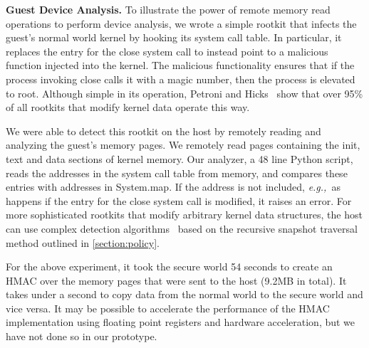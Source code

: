 \documentclass[pageno]{sig-alternate-05-2015}
\newcommand{\sectref}[1]{\autoref{#1}}
\newcommand{\myparagraph}[1]{\indent\par\noindent\textsf{\textbf{#1.}}}
\newcommand{\eg}{\textit{e.g.,}}
\begin{document}
\myparagraph{Guest Device Analysis}
%
To illustrate the power of remote memory read operations to perform device
analysis, we wrote a simple rootkit that infects the guest's normal world
kernel by hooking its system call table. In particular, it replaces the entry
for the \textsf{close} system call to instead point to a malicious function
injected into the kernel. The malicious functionality ensures that if the
process invoking \textsf{close} calls it with a magic number, then the process
is elevated to \textsf{root}.  Although simple in its operation, Petroni and
Hicks~\cite{sbcfi:ccs07} show that over 95\% of all rootkits that modify kernel
data operate this way.

We were able to detect this rootkit on the host by remotely reading and
analyzing the guest's memory pages. We remotely read pages containing the
\textsf{init}, \textsf{text} and \textsf{data} sections of kernel memory. Our
analyzer, a 48 line Python script, reads the addresses in the system call table
from memory, and compares these entries with addresses in \textsf{System.map}.
If the address is not included, \eg~as happens if the entry for the
\textsf{close} system call is modified, it raises an error. For more
sophisticated rootkits that modify arbitrary kernel data structures, the host
can use complex detection algorithms~\cite{sbcfi:ccs07,gib:tdsc11,kop:ccs09}
based on the recursive snapshot traversal method outlined in
\sectref{section:policy}.

For the above experiment, it took the secure world 54 seconds to create an HMAC
over the memory pages that were sent to the host (9.2MB in total). It takes
under a second to copy data from the normal world to the secure world and vice
versa. It may be possible to accelerate the performance of the HMAC
implementation using floating point registers and hardware acceleration, but we
have not done so in our prototype.

% 
\newcommand{\apperr}{\textsc{\small AppErrMsg}}
\newcommand{\lostconn}{\textsc{\small LostConn}}
\newcommand{\anderr}{\textsc{\small AndroidErrMsg}}
\newcommand{\emptyfile}{\textsc{\small EmptyFile}}
\newcommand{\blnkscrn}{\textsc{\small BlankScreen}}
\newcommand{\im}{\it\bfseries\small}
\end{document}
